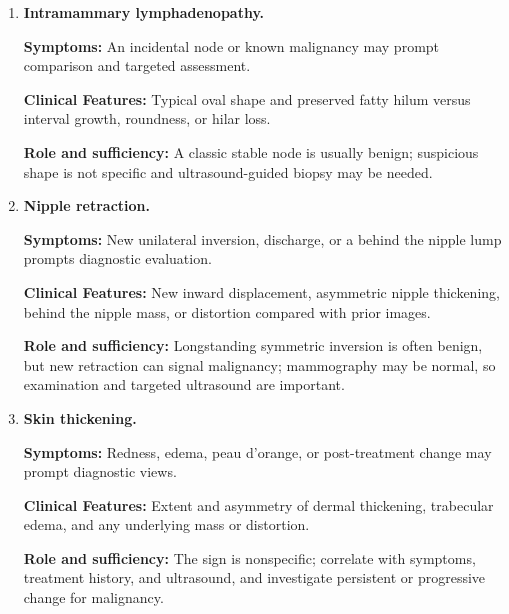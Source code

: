 \begin{enumerate}[leftmargin=*,itemsep=0.45em,topsep=0.4em]
\item \textbf{Intramammary lymphadenopathy.}\par\noindent\textbf{Symptoms:} An incidental node or known malignancy may prompt comparison and targeted assessment.\par\noindent\textbf{Clinical Features:} Typical oval shape and preserved fatty hilum versus interval growth, roundness, or hilar loss.\par\noindent\textbf{Role and sufficiency:} A classic stable node is usually benign; suspicious shape is not specific and ultrasound-guided biopsy may be needed.
\item \textbf{Nipple retraction.}\par\noindent\textbf{Symptoms:} New unilateral inversion, discharge, or a behind the nipple lump prompts diagnostic evaluation.\par\noindent\textbf{Clinical Features:} New inward displacement, asymmetric nipple thickening, behind the nipple mass, or distortion compared with prior images.\par\noindent\textbf{Role and sufficiency:} Longstanding symmetric inversion is often benign, but new retraction can signal malignancy; mammography may be normal, so examination and targeted ultrasound are important.
\item \textbf{Skin thickening.}\par\noindent\textbf{Symptoms:} Redness, edema, peau d'orange, or post-treatment change may prompt diagnostic views.\par\noindent\textbf{Clinical Features:} Extent and asymmetry of dermal thickening, trabecular edema, and any underlying mass or distortion.\par\noindent\textbf{Role and sufficiency:} The sign is nonspecific; correlate with symptoms, treatment history, and ultrasound, and investigate persistent or progressive change for malignancy.
\end{enumerate}

